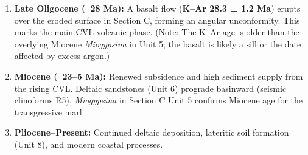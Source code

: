 \documentclass[11pt]{article}
\newcommand{\cle}[1]{{\popxbold\color{popdark}#1}}
\begin{document}
\begin{exoresolu}
\begin{enumerate}
    \item \textbf{Late Oligocene (~28 Ma):} A basalt flow (\textbf{K–Ar 28.3 ± 1.2 Ma}) erupts over the eroded surface in Section C, forming an \cle{angular unconformity}. This marks the main CVL volcanic phase. (Note: The K–Ar age is older than the overlying Miocene \emph{Miogypsina} in Unit 5; the basalt is likely a sill or the date affected by excess argon.)
    \item \textbf{Miocene (~23–5 Ma):} Renewed subsidence and high sediment supply from the rising CVL. Deltaic sandstones (Unit 6) prograde basinward (seismic clinoforms R5). \emph{Miogypsina} in Section C Unit 5 confirms Miocene age for the transgressive marl.
    \item \textbf{Pliocene–Present:} Continued deltaic deposition, lateritic soil formation (Unit 8), and modern coastal processes.
\end{enumerate}
\end{exoresolu}
\end{document}
